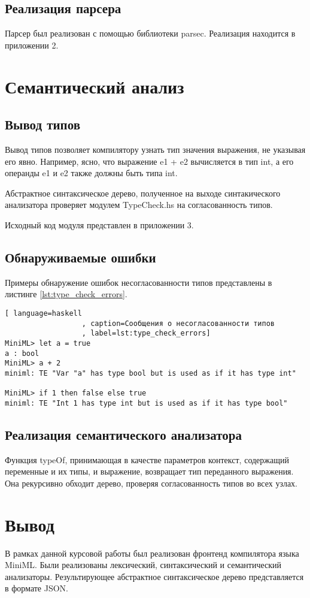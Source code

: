 \documentclass[a4paper,12pt]{article}
\numberwithin{equation}{section}
\begin{document}
\subsection{Реализация парсера}
Парсер был реализован с помощью библиотеки parsec. Реализация находится
в приложении 2.

\section{Семантический анализ}
\subsection{Вывод типов}
Вывод типов позволяет компилятору узнать тип значения выражения, не
указывая его явно. Например, ясно, что выражение e1 + e2 вычисляется
в тип int, а его операнды e1 и e2 также должны быть типа int.


Абстрактное синтаксическое дерево, полученное на выходе синтакического
анализатора проверяет модулем TypeCheck.hs на согласованность типов.


Исходный код модуля представлен в приложении 3.

\subsection{Обнаруживаемые ошибки}
Примеры обнаружение ошибок несогласованности типов представлены
в листинге \ref{lst:type_check_errors}.

\begin{lstlisting}[ language=haskell
                  , caption=Сообщения о несогласованности типов
                  , label=lst:type_check_errors]
MiniML> let a = true
a : bool
MiniML> a + 2
miniml: TE "Var "a" has type bool but is used as if it has type int"

MiniML> if 1 then false else true
miniml: TE "Int 1 has type int but is used as if it has type bool"
\end{lstlisting}

\subsection{Реализация семантического анализатора}
Функция typeOf, принимающая в качестве параметров контекст,
содержащий переменные и их типы, и выражение, возвращает тип
переданного выражения. Она рекурсивно обходит дерево, проверяя
согласованность типов во всех узлах.

\section{Вывод}
В рамках данной курсовой работы был реализован фронтенд компилятора
языка MiniML. Были реализованы лексический, синтаксический и 
семантический анализаторы. Результирующее абстрактное синтаксическое
дерево представляется в формате JSON.
\end{document}
